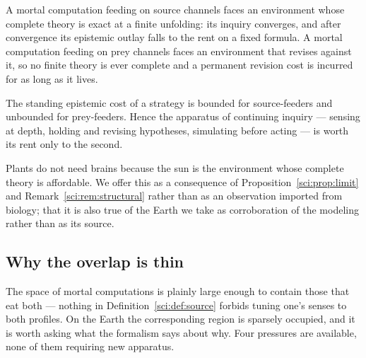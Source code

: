 \begin{proposition}
\label{sci:prop:twosciences}
A mortal computation feeding on source channels faces an environment whose complete theory is exact at
a finite unfolding: its inquiry converges, and after convergence its epistemic outlay falls to the
rent on a fixed formula. A mortal computation feeding on prey channels faces an environment that
revises against it, so no finite theory is ever complete and a permanent revision cost is incurred for
as long as it lives.
\end{proposition}

\begin{corollary}
\label{sci:cor:intelligence}
The standing epistemic cost of a strategy is bounded for source-feeders and unbounded for prey-feeders.
Hence the apparatus of continuing inquiry --- sensing at depth, holding and revising hypotheses,
simulating before acting --- is worth its rent only to the second.
\end{corollary}

Plants do not need brains because the sun is the environment whose complete theory is affordable. We
offer this as a consequence of Proposition~\ref{sci:prop:limit} and Remark~\ref{sci:rem:structural} rather
than as an observation imported from biology; that it is also true of the Earth we take as
corroboration of the modeling rather than as its source.

\subsection{Why the overlap is thin}\label{sci:S11.4}

The space of mortal computations is plainly large enough to contain those that eat both --- nothing in
Definition~\ref{sci:def:source} forbids tuning one's senses to both profiles. On the Earth the
corresponding region is sparsely occupied, and it is worth asking what the formalism says about why.
Four pressures are available, none of them requiring new apparatus.

